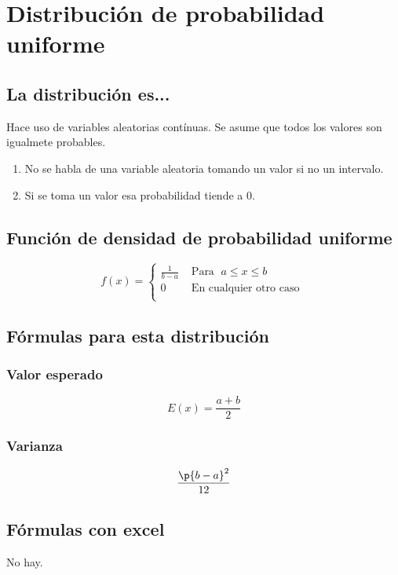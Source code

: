 \documentclass{article}
\begin{document}

\hrulefill
\section{Distribución de probabilidad uniforme}
\subsection{La distribución es...}
Hace uso de variables aleatorias contínuas. Se asume que todos los valores son igualmete probables. 
\begin{enumerate}
    \item No se habla de una variable aleatoria tomando un valor si no un intervalo. 
    \item Si se toma un valor esa probabilidad tiende a $0$.
\end{enumerate}

\subsection{Función de densidad de probabilidad uniforme}
\[
  f(x) = \begin{cases}
    \frac{1}{b-a} & \text{ Para }\; a \leq x \leq b \\ 
    0 & \text{ En cualquier otro caso } \\ 
  \end{cases} 
\]

\subsection{Fórmulas para esta distribución}
\subsubsection{Valor esperado}
\[
  E(x) = \frac{a+b}{2} 
\]
\subsubsection{Varianza}
\[
  \frac{\p{b-a} ^2}{12} 
\]

\subsection{Fórmulas con excel}
No hay.
\end{document}
